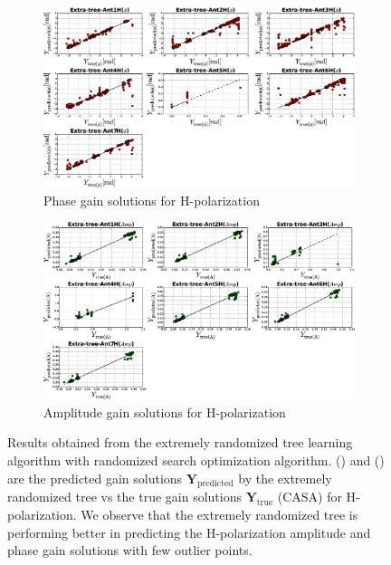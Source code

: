\begin{figure}[H]
   \centering
    \begin{subfigure}[t]{0.52\textheight}
        
        \includegraphics[width=\textwidth]{images/Extra-treeHphase.eps} 
        \caption{Phase gain solutions for H-polarization} \label{A6}
    \end{subfigure}
    
      \begin{subfigure}[t]{0.52\textheight}
       
        \includegraphics[width=\textwidth]{images/Extra-treeHamp.eps} 
        \caption{Amplitude gain solutions for H-polarization} \label{B6}
    \end{subfigure}
    \caption{Results obtained from the extremely randomized tree learning algorithm with randomized search optimization algorithm. () and () are the predicted gain solutions $\textbf{Y}_\mathrm{predicted}$ by the extremely randomized tree  vs the true gain solutions $\textbf{Y}_\mathrm{true}$ (CASA) for H-polarization. We observe that the extremely randomized tree is performing better in predicting the H-polarization amplitude and phase gain solutions with few outlier points.}
    \label{BB7}
    \end{figure}
    
